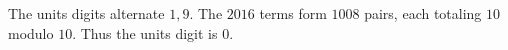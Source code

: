 The units digits alternate $1,9$. The $2016$ terms form $1008$ pairs, each totaling $10$ modulo $10$. Thus the units digit is $\boxed0$.
